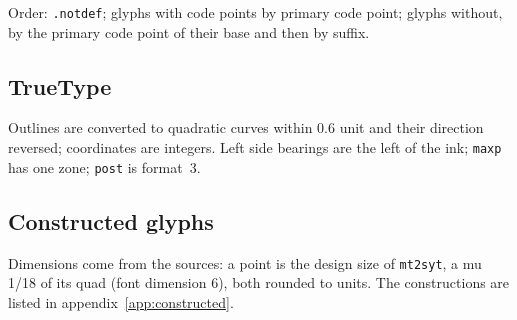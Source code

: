 \documentclass[10pt]{article}
\newcommand\file[1]{\texttt{#1}}
\newcommand\code[1]{\texttt{#1}}
\begin{document}
Order: \code{.notdef}; glyphs with code points by primary code point;
glyphs without, by the primary code point of their base and then by
suffix.

\subsection{TrueType}\label{app:truetype}

Outlines are converted to quadratic curves within 0.6 unit and their
direction reversed; coordinates are integers.  Left side bearings are
the left of the ink; \code{maxp} has one zone; \code{post} is format~3.

\subsection{Constructed glyphs}\label{sec:constructed}

Dimensions come from the sources: a point is the design size of
\file{mt2syt}, a mu 1/18 of its quad (font dimension 6), both rounded
to units.  The constructions are listed in
appendix~\ref{app:constructed}.
\end{document}
